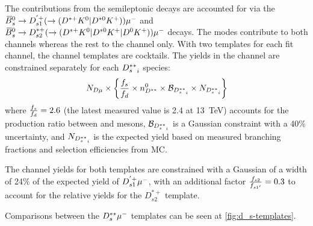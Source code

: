 The contributions from the semileptonic \Bsb decays are accounted for via
the ${{\kern 0.18em\overline{\kern -0.18em B}}{}^0_{s}} \rightarrow D_{s1}^{'+} (\rightarrow ({{D}^{*+}}{{K}^0}|{{D}^{*0}}{{K}^+})){\mu^-}$ and
${{\kern 0.18em\overline{\kern -0.18em B}}{}^0_{s}} \rightarrow D_{s2}^{*+} (\rightarrow ({{D}^{*+}}{{K}^0}|{{D}^{*0}}{{K}^+}|{{D}^0}{{K}^+})){\mu^-}$
decays.
The \Dstarp\Kz\mun modes contribute to both channels whereas the
rest to the \Dz channel only.
With two templates for each fit channel,
the \Dz channel templates are cocktails.
The yields in the \Dz channel are constrained separately for each
${D_s^{**}}_i$ species:
\begin{equation}
    N_{D\mu} \times \left\{
        \frac{f_s}{f_d} \times n^{0}_{D^{**}} \times \mathcal{B}_{{D_s^{**}}_i} \times
        N_{{D_s^{**}}_i}
    \right\}
\end{equation}
where $\frac{f_s}{f_d} = 2.6$ (the latest measured value is 2.4 at 13~TeV) accounts for
the production ratio between \Bzb and \Bsb mesons,
$\mathcal{B}_{{D_s^{**}}_i}$ is a Gaussian constraint with a 40\% uncertainty,
and $N_{{D_s^{**}}_i}$ is the expected yield based on measured branching fractions
and selection efficiencies from MC.

The \Dstar channel yields for both templates are constrained with a Gaussian of
a width of 24\% of the expected yield of $D_{s1}^{'+}{\mu^-}$,
with an additional factor $\frac{f_{s2}}{f_{s1'}} = 0.3$ to account for the relative
yields for the $D_{s2}^{*+}$ template.

Comparisons between the $D_s^{**}{\mu^-}$ templates can be seen at
\cref{fig:d_s-templates}.

